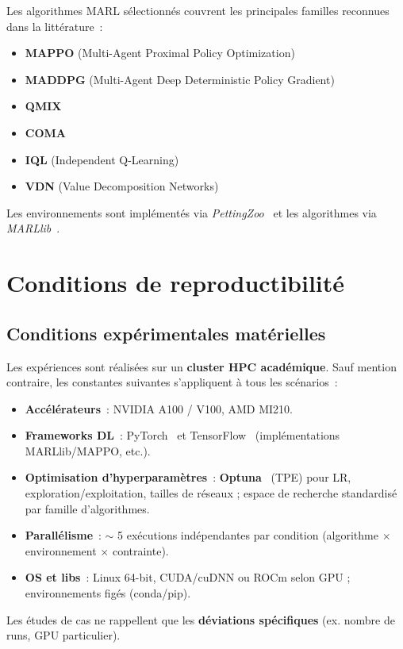 \medskip

Les algorithmes MARL sélectionnés couvrent les principales familles reconnues dans la littérature~:
\begin{itemize}
  \item \textbf{MAPPO} (Multi-Agent Proximal Policy Optimization)~\cite{Yu2022}
  \item \textbf{MADDPG} (Multi-Agent Deep Deterministic Policy Gradient)~\cite{lowe2017multi}
  \item \textbf{QMIX}~\cite{rashid2018qmix}
  \item \textbf{COMA}~\cite{foerster2018counterfactual}
  \item \textbf{IQL} (Independent Q-Learning)~\cite{Jiang2022}
  \item \textbf{VDN} (Value Decomposition Networks)~\cite{sunehag2018value}
\end{itemize}
Les environnements sont implémentés via \textit{PettingZoo}~\cite{terry2020pettingzoo} et les algorithmes via \textit{MARLlib}~\cite{hu2022marllib}.

\section{Conditions de reproductibilité}

\subsection{Conditions expérimentales matérielles}
\label{par:compute_conditions}
Les expériences sont réalisées sur un \textbf{cluster HPC académique}. Sauf mention contraire, les constantes suivantes s’appliquent à tous les scénarios~:
\begin{itemize}
  \item \textbf{Accélérateurs}~: NVIDIA A100 / V100, AMD MI210.
  \item \textbf{Frameworks DL}~: PyTorch~\cite{Paszke2019} et TensorFlow~\cite{Abadi2016} (implémentations MARLlib/MAPPO, etc.).
  \item \textbf{Optimisation d’hyperparamètres}~: \textbf{Optuna}~\cite{akiba2019optuna} (TPE) pour LR, exploration/exploitation, tailles de réseaux ; espace de recherche standardisé par famille d’algorithmes.
  \item \textbf{Parallélisme}~: $\sim$ 5 exécutions indépendantes par condition (algorithme $\times$ environnement $\times$ contrainte).
  \item \textbf{OS et libs}~: Linux 64-bit, CUDA/cuDNN ou ROCm selon GPU ; environnements figés (conda/pip).
\end{itemize}
Les études de cas ne rappellent que les \textbf{déviations spécifiques} (ex. nombre de runs, GPU particulier).

